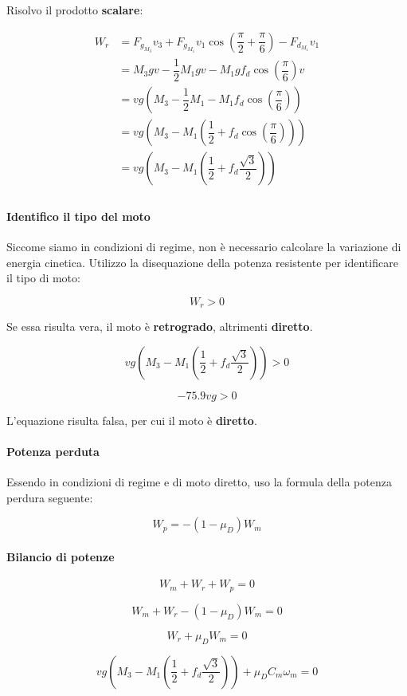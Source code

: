 \documentclass[main.tex]{subfiles}
\begin{document}
Risolvo il prodotto \textbf{scalare}:

\begin{align*}
	W_r &= F_{g_{M_3}}v_3 + F_{g_{M_1}}v_1\cos\left( \dfrac{\pi}{2} + \dfrac{\pi}{6} \right ) - F_{d_{M_1}}v_1\\
	&= M_3gv - \dfrac{1}{2}M_1gv - M_1g f_d \cos(\dfrac{\pi}{6})v\\
	&= vg(M_3 - \dfrac{1}{2}M_1 - M_1 f_d \cos(\dfrac{\pi}{6}))\\
	&= vg(M_3 - M_1(\dfrac{1}{2} + f_d \cos(\dfrac{\pi}{6})))\\
	&= vg(M_3 - M_1(\dfrac{1}{2} + f_d\dfrac{\sqrt{3}}{2}))\\
\end{align*}

\paragraph{Identifico il tipo del moto} Siccome siamo in condizioni di regime, non è necessario calcolare la variazione di energia cinetica. Utilizzo la disequazione della potenza resistente per identificare il tipo di moto:

\[
	W_r > 0
\]

Se essa risulta vera, il moto è \textbf{retrogrado}, altrimenti \textbf{diretto}.

\[
	 vg(M_3 - M_1(\dfrac{1}{2} + f_d\dfrac{\sqrt{3}}{2}))>0
\]

\[
	-75.9vg>0
\]

L'equazione risulta falsa, per cui il moto è \textbf{diretto}.

\paragraph{Potenza perduta} Essendo in condizioni di regime e di moto diretto, uso la formula della potenza perdura seguente:

\[
	W_p = -(1-\mu_D)W_m
\]

\paragraph{Bilancio di potenze}

\[
	W_m + W_r + W_p = 0
\]

\[
	W_m + W_r -(1-\mu_D)W_m = 0
\]

\[
	W_r +\mu_DW_m = 0
\]

\[
	vg(M_3 - M_1(\dfrac{1}{2} + f_d\dfrac{\sqrt{3}}{2})) +\mu_DC_m\omega_m = 0
\]
\end{document}
